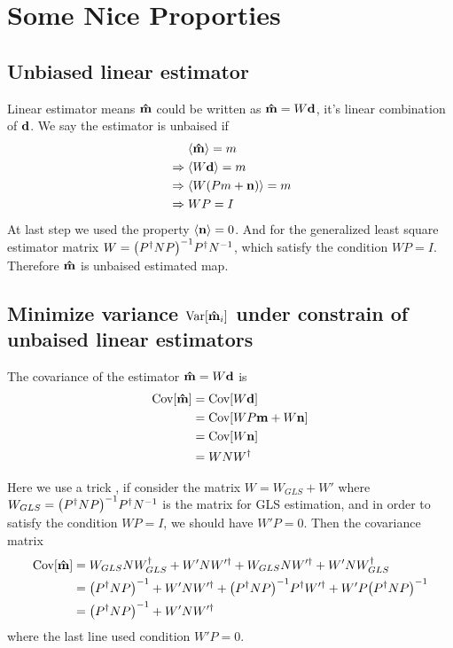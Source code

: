 \documentclass[11pt, letterpaper]{article}
\newcommand{\Var}[1]{\text{Var}\qty[#1]}
\newcommand{\Cov}[1]{\text{Cov}\qty[#1]}
\newcommand{\vbd}{\vb{d}}
\newcommand{\vbm}{\vb{m}}
\newcommand{\vbn}{\vb{n}}
\newcommand{\inv}[1]{#1^{-1}}
\newcommand{\hatm}{\vb{\hat{m}}}
\newcommand{\Pdagger}{P^{\dagger}}
\newcommand{\PPinv}[1]{\inv{\qty(\Pdagger #1 P)}}
\begin{document}
\section{Some Nice Proporties}

\subsection{Unbiased linear estimator}
Linear estimator means $\hatm$ could be written as $\hatm = W\vbd$,
it's linear combination of $\vbd$.
We say the estimator is unbaised if
\begin{align}
\begin{aligned}[b]
&\mathrel{\phantom{\Rightarrow}}\ev{\hatm} = m \\
&\Rightarrow\ev{W \vbd} = m\\
&\Rightarrow\ev{W(Pm + \vbn) } = m \\
&\Rightarrow WP = I
\end{aligned}
\end{align}
At last step we used the property  $\ev{\vbn} = 0$.
And for the generalized least square estimator matrix 
$W = \PPinv{N} \Pdagger \inv{N}  $, which satisfy the condition $WP=I$.
Therefore $\hatm$ is unbaised estimated map.


\subsection{Minimize variance $\Var{\hatm_i}$ under constrain of unbaised 
linear estimators} \label{minimize variance}
The covariance of the estimator $\hatm = W \vbd$ is
\begin{align}
\begin{aligned}[b]
\Cov{\hatm} &= \Cov{W\vbd} 
\\ 
&= \Cov{WP\vbm + W\vbn} 
\\ 
&= \Cov{W\vbn} 
\\ 
&= W N W^{\dagger} \label{covariance hatm}
\end{aligned}
\end{align}

Here we use a trick \cite{weighted_and_GLS},
if consider the matrix $W = W_{GLS} + W'$ where
$W_{GLS} = \PPinv{N} \Pdagger \inv{N} $ is the matrix for GLS estimation,
and in order to satisfy the condition $WP = I$, we should have $W'P = 0$.
Then the covariance matrix
\begin{align}
\begin{aligned}[b]
\Cov{\hatm }
&= W_{GLS} N W_{GLS}^{\dagger} + W' N W'^{\dagger} 
    + W_{GLS} N W'^{\dagger} + W' N W_{GLS}^{\dagger}
\\
&= \PPinv{N} + W' N W'^{\dagger} 
    + \PPinv{N} \Pdagger W'^{\dagger} + W' P \PPinv{N}
\\
&= \PPinv{N} + W' N W'^{\dagger} 
\end{aligned}
\end{align}
where the last line used condition $W'  P = 0$.
\end{document}
